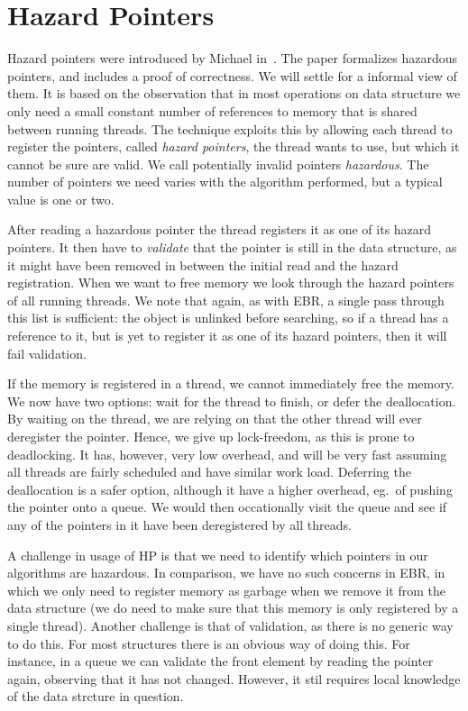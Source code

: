\documentclass[b5paper]{report}
\begin{document}
\section{Hazard Pointers}

Hazard pointers were introduced by Michael in~\cite{michael2004hazard}.  The
paper formalizes hazardous pointers, and includes a proof of correctness. We
will settle for a informal view of them. It is based on the observation that in
most operations on data structure we only need a small constant number of
references to memory that is shared between running threads. The technique
exploits this by allowing each thread to register the pointers, called
\emph{hazard pointers}, the thread wants to use, but which it cannot be sure are
valid. We call potentially invalid pointers \emph{hazardous}. The number of
pointers we need varies with the algorithm performed, but a typical value is one
or two.

After reading a hazardous pointer the thread registers it as one of its hazard
pointers. It then have to \emph{validate} that the pointer is still in the data
structure, as it might have been removed in between the initial read and the
hazard registration. When we want to free memory we look through the hazard
pointers of all running threads. We note that again, as with EBR, a single pass
through this list is sufficient: the object is unlinked before searching, so if
a thread has a reference to it, but is yet to register it as one of its hazard
pointers, then it will fail validation.

If the memory is registered in a thread, we cannot immediately free the
memory. We now have two options: wait for the
thread to finish, or defer the deallocation.
By waiting on the thread, we are relying on that the other thread will ever
deregister the pointer. Hence, we give up lock-freedom, as this is prone to
deadlocking. It has, however, very low overhead, and will be very fast assuming
all threads are fairly scheduled and have similar work load.
Deferring the deallocation is a safer option, although it have a higher
overhead, eg.\ of pushing the pointer onto a queue. We would then occationally
visit the queue and see if any of the pointers in it have been deregistered by
all threads.

A challenge in usage of HP is that we need to identify which pointers in our
algorithms are hazardous. In comparison, we have no such concerns in EBR, in
which we only need to register memory as garbage when we remove it from the data
structure (we do need to make sure that this memory is only registered by a
single thread). Another challenge is that of validation, as there is no generic
way to do this. For most structures there is an obvious way of doing this. For
instance, in a queue we can validate the front element by reading the
 pointer again, observing that it has not changed. However, it stil
requires local knowledge of the data strcture in question.
\end{document}
